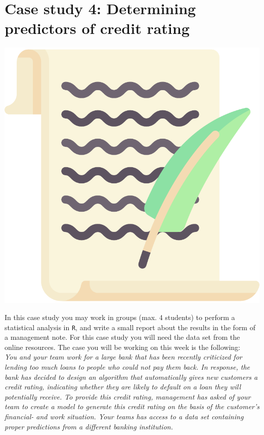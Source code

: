 
\begin{minipage}{0.8\textwidth}
\section{Case study 4: Determining predictors of credit rating}
\end{minipage}%
\hfill%
\begin{minipage}{0.1\textwidth}
\includegraphics[width=\linewidth]{Files/Images/lettericon.pdf}
\end{minipage}
\vspace*{.1cm}

In this case study you may work in groups (max. 4 students) to perform a statistical analysis in \texttt{R}, and write a small report about the results in the form of a management note. For this case study you will need the data set  from the online resources. The case you will be working on this week is the following: \\

\textit{You and your team work for a large bank that has been recently criticized for lending too much loans to people who could not pay them back. In response, the bank has decided to design an algorithm that automatically gives new customers a credit rating, indicating whether they are likely to default on a loan they will potentially receive. To provide this credit rating, management has asked of your team to create a model to generate this credit rating on the basis of the customer's financial- and work situation. Your teams has access to a data set containing proper predictions from a different banking institution.} \\

